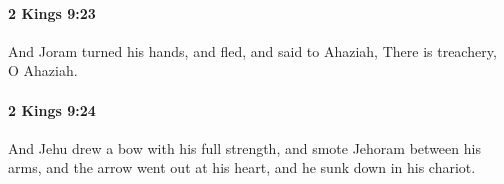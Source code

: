 		\paragraph{2 Kings 9:23} %
			\label{2KINGS-9-23}

			And Joram turned his hands, and fled, and said to Ahaziah, There is treachery, O Ahaziah.


		\paragraph{2 Kings 9:24} %
			\label{2KINGS-9-24}

			And Jehu drew a bow with his full strength, and smote Jehoram between his arms, and the arrow went out at his heart, and he sunk down in his chariot.


